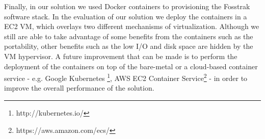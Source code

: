 Finally, in our solution we used Docker containers to provisioning the Fosstrak software stack.
In the evaluation of our solution we deploy the containers in a \gls{EC2} \gls{VM}, which overlays two
different mechanisms of virtualization. Although we still are able to take advantage of some benefits
from the containers such as the portability, other benefits such as the low I/O and disk space are
hidden by the \gls{VM} hypervisor. A future improvement that can be made is to perform the deployment
of the containers on top of the bare-metal or a cloud-based container service - e.g. Google Kubernetes
\footnote{http://kubernetes.io/}, \gls{AWS} \gls{EC2} Container Service\footnote{https://aws.amazon.com/ecs/} -
in order to improve the overall performance of the solution.
